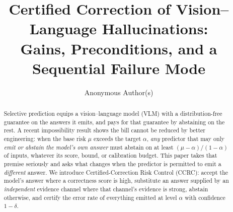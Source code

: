 \documentclass[review,number,doubleblind]{elsarticle}
\theoremstyle{plain}
\theoremstyle{definition}
\theoremstyle{remark}
\begin{document}
\begin{frontmatter}

\title{Certified Correction of Vision--Language Hallucinations:\\
Gains, Preconditions, and a Sequential Failure Mode}

\author{Anonymous Author(s)}
\address{Address withheld for double-anonymized review}

\begin{abstract}
Selective prediction equips a vision--language model (VLM) with a distribution-free
guarantee on the answers it emits, and pays for that guarantee by abstaining on the rest.
A recent impossibility result shows the bill cannot be reduced by better engineering: when
the base risk $\mu$ exceeds the target $\alpha$, \emph{any} predictor that may only
\emph{emit or abstain the model's own answer} must abstain on at least
$(\mu-\alpha)/(1-\alpha)$ of inputs, whatever its score, bound, or calibration budget.
This paper takes that premise seriously and asks what changes when the predictor is
permitted to emit a \emph{different} answer. We introduce Certified-Correction Risk
Control (CCRC): accept the model's answer where a correctness score is high, substitute an
answer supplied by an \emph{independent} evidence channel where that channel's evidence is
strong, abstain otherwise, and certify the error rate of everything emitted at level
$\alpha$ with confidence $1-\delta$.


\end{abstract}
\end{frontmatter}
\end{document}
